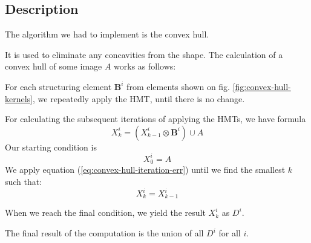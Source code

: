 \documentclass[12pt]{article}
\begin{document}
\subsection{Description}
The algorithm we had to implement is the convex hull.

It is used to eliminate any concavities from the shape.
The calculation of a convex hull of some image $A$ works as follows:

For each structuring element $\mathbf{B}^i$ from elements shown on fig. \ref{fig:convex-hull-kernels},
we repeatedly apply the HMT, until there is no change.

For calculating the subsequent iterations of applying the HMTs, we have formula
\begin{equation}
    X^i_k = (X^i_{k-1} \otimes \mathbf{B}^i) \cup A
    \label{eq:convex-hull-iteration-err}
\end{equation}
Our starting condition is
\begin{equation}
    X^i_0 = A
    \label{eq:convex-hull-start-condition}
\end{equation}
We apply equation (\ref*{eq:convex-hull-iteration-err}) until we find the smallest $k$ such that:
\begin{equation}
    X^i_k = X^i_{k-1}
    \label{eq:convex-hull-final-condition}
\end{equation}

When we reach the final condition, we yield the result $X^i_k$ as $D^i$.

The final result of the computation is the union of all $D^i$ for all $i$.
\end{document}
